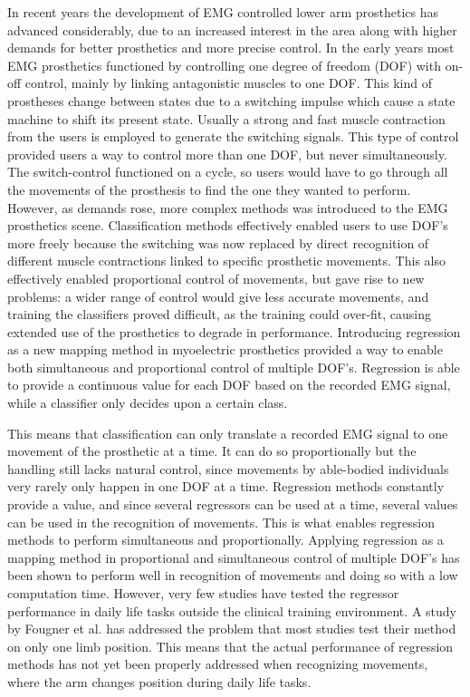 \begin{multicols}{2}
%		
In recent years the development of EMG controlled lower arm prosthetics has advanced considerably, due to an increased interest in the area along with higher demands for better prosthetics and more precise control. \cite{Fougner2012} In the early years most EMG prosthetics functioned by controlling one degree of freedom (DOF) with on-off control, mainly by linking antagonistic muscles to one DOF. This kind of prostheses change between states due to a switching impulse which cause a state machine to shift its present state. Usually a strong and fast muscle contraction from the users is employed to generate the switching signals. \cite{amsuess2014}
This type of control provided users a way to control more than one DOF, but never simultaneously. The switch-control functioned on a cycle, so users would have to go through all the movements of the prosthesis to find the one they wanted to perform. However, as demands rose, more complex methods was introduced to the EMG prosthetics scene. Classification methods effectively enabled users to use DOF's more freely because the switching was now replaced by direct recognition of different muscle contractions linked to specific prosthetic movements. This also effectively enabled proportional control of movements, but gave rise to new problems: a wider range of control would give less accurate movements, and training the classifiers proved difficult, as the training could over-fit, causing extended use of the prosthetics to degrade in performance. \cite{Ison2016}
Introducing regression as a new mapping method in myoelectric prosthetics provided a way to enable both simultaneous and proportional control of multiple DOF's. Regression is able to provide a continuous value for each DOF based on the recorded EMG signal, while a classifier only decides upon a certain class. \cite{hahne2014, jiang2010}

This means that classification can only translate a recorded EMG signal to one movement of the prosthetic at a time. It can do so proportionally but the handling still lacks natural control, since movements by able-bodied individuals very rarely only happen in one DOF at a time. Regression methods constantly provide a value, and since several regressors can be used at a time, several values can be used in the recognition of movements. This is what enables regression methods to perform simultaneous and proportionally. 
Applying regression as a mapping method in proportional and simultaneous control of multiple DOF's has been shown to perform well in recognition of movements and doing so with a low computation time. \cite{hahne2014} However, very few studies have tested the regressor performance in daily life tasks outside the clinical training environment. \cite{jiang2012} A study by Fougner et al. \cite{Fougner2011} has addressed the problem that most studies test their method on only one limb position. This means that the actual performance of regression methods has not yet been properly addressed when recognizing movements, where the arm changes position during daily life tasks. 


\end{multicols}
